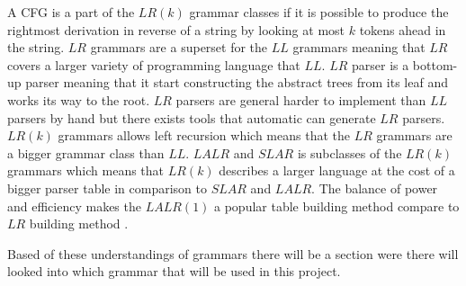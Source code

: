 A CFG is a part of the $LR(k)$ grammar classes if it is possible to produce the rightmost derivation in reverse of a string by looking at most $k$ tokens ahead in the string. $LR$ grammars are a superset for the $LL$ grammars meaning that $LR$ covers a larger variety of programming language that $LL$. $LR$ parser is a bottom-up parser meaning that it start constructing the abstract trees from its leaf and works its way to the root. $LR$ parsers are general harder to implement than $LL$ parsers by hand but there exists tools that automatic can generate $LR$ parsers. $LR(k)$ grammars allows left recursion which means that the $LR$ grammars are a bigger grammar class than $LL$. $LALR$ and $SLAR$ is subclasses of the $LR(k)$ grammars which means that $LR(k)$ describes a larger language at the cost of a bigger parser table in comparison to $SLAR$ and $LALR$. The balance of power and efficiency makes the $LALR(1)$ a popular table building method compare to $LR$ building method \citep{CraftingACompiler} \citep{sebesta}.

Based of these understandings of grammars there will be a section were there will looked into which grammar that will be used in this project.